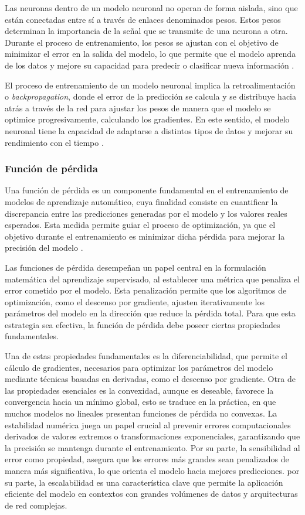 Las neuronas dentro de un modelo neuronal no operan de forma aislada, sino que están conectadas entre sí a través de enlaces denominados pesos. Estos pesos determinan la importancia de la señal que se transmite de una neurona a otra. Durante el proceso de entrenamiento, los pesos se ajustan con el objetivo de minimizar el error en la salida del modelo, lo que permite que el modelo aprenda de los datos y mejore su capacidad para predecir o clasificar nueva información \cite{haykin2009neural}.

El proceso de entrenamiento de un modelo neuronal implica la retroalimentación o \textit{backpropagation}, donde el error de la predicción se calcula y se distribuye hacia atrás a través de la red para ajustar los pesos de manera que el modelo se optimice progresivamente, calculando los gradientes. En este sentido, el modelo neuronal tiene la capacidad de adaptarse a distintos tipos de datos y mejorar su rendimiento con el tiempo \cite{nielsen2015neural}.

\subsubsection{Función de pérdida}
Una función de pérdida es un componente fundamental en el entrenamiento de modelos de aprendizaje automático, cuya finalidad consiste en cuantificar la discrepancia entre las predicciones generadas por el modelo y los valores reales esperados. Esta medida permite guiar el proceso de optimización, ya que el objetivo durante el entrenamiento es minimizar dicha pérdida para mejorar la precisión del modelo \cite{eitca_loss_function}.

Las funciones de pérdida desempeñan un papel central en la formulación matemática del aprendizaje supervisado, al establecer una métrica que penaliza el error cometido por el modelo. Esta penalización permite que los algoritmos de optimización, como el descenso por gradiente, ajusten iterativamente los parámetros del modelo en la dirección que reduce la pérdida total. Para que esta estrategia sea efectiva, la función de pérdida debe poseer ciertas propiedades fundamentales.

Una de estas propiedades fundamentales es la diferenciabilidad, que permite el cálculo de gradientes, necesarios para optimizar los parámetros del modelo mediante técnicas basadas en derivadas, como el descenso por gradiente. Otra de las propiedades esenciales es la convexidad, aunque es deseable, favorece la convergencia hacia un mínimo global, esto se traduce en la práctica, en que muchos modelos no lineales presentan funciones de pérdida no convexas. La estabilidad numérica juega un papel crucial al prevenir errores computacionales derivados de valores extremos o transformaciones exponenciales, garantizando que la precisión se mantenga durante el entrenamiento. Por su parte, la sensibilidad al error como propiedad, asegura que los errores más grandes sean penalizados de manera más significativa, lo que orienta el modelo hacia mejores predicciones. por su parte, la escalabilidad es una característica clave que permite la aplicación eficiente del modelo en contextos con grandes volúmenes de datos y arquitecturas de red complejas.

